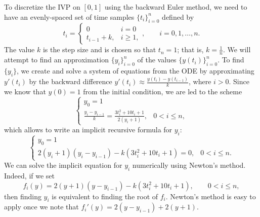 \documentclass{homework}
\begin{document}
\begin{arabicparts}
		\questionpart To discretize the IVP on $[0,1]$ using the backward Euler method, we need to have an evenly-spaced set of time samples $\{t_i\}_{i=0}^n$ defined by
		\begin{equation}
			t_i = \begin{cases}
				0 & i = 0 \\
				t_{i-1} + k, & i \ge 1,
			\end{cases}, \qquad i = 0,1,\dots,n.
		\end{equation}
		The value $k$ is the step size and is chosen so that $t_n = 1$; that is, $k = \frac{1}{n}$. We will attempt to find an approximation $\{y_i\}_{i=0}^n$ of the values $\{y(t_i)\}_{i=0}^n$. To find $\{y_i\}$, we create and solve a system of equations from the ODE by approximating $y'(t_i)$ by the backward difference $y'(t_i) \approx \frac{y(t_i) - y(t_{i-1})}{k}$, where $i > 0$. Since we know that $y(0) = 1$ from the initial condition, we are led to the scheme
		\begin{equation}
			\begin{cases}
				y_0 = 1 &\\
				\frac{y_i - y_{i-1}}{k} = \frac{3t_i^2+10t_i + 1}{2(y_i + 1)}, & 0 < i \le n,
			\end{cases}
		\end{equation}
		which allows to write an implicit recursive formula for $y_i$:
		\begin{equation}
			\begin{cases}
				y_0 = 1 &\\
				2(y_i+1)(y_i-y_{i-1}) - k(3t_i^2+10t_i+1) = 0, & 0 < i \le n.
			\end{cases}
		\end{equation}
		We can solve the implicit equation for $y_i$ numerically using Newton's method. Indeed, if we set
		\begin{equation}
			f_i(y) = 2(y+1)(y-y_{i-1}) - k(3t_i^2+10t_i+1), \qquad 0 < i\le n,
		\end{equation}
		then finding $y_i$ is equivalent to finding the root of $f_i$. Newton's method is easy to apply once we note that $f_i'(y) = 2(y-y_{i-1}) + 2(y+1)$.
	\end{arabicparts}
\end{document}
